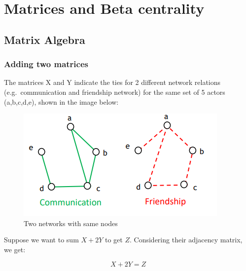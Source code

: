 \documentclass[
  notitlepage,
  onecolumn,
  openany]{book}
\begin{document}
\hypertarget{matrices-and-beta-centrality}{%
\chapter{Matrices and Beta centrality}\label{matrices-and-beta-centrality}}

\hypertarget{matrix-algebra}{%
\section{Matrix Algebra}\label{matrix-algebra}}

\hypertarget{adding-two-matrices}{%
\subsection{Adding two matrices}\label{adding-two-matrices}}

The matrices X and Y indicate the ties for 2 different network relations (e.g.~communication and friendship network) for the same set of 5 actors (a,b,c,d,e), shown in the image below:

\begin{figure}

{\centering \includegraphics[width=0.4\linewidth]{images/05-Matrices and Beta centrality/Untitled} 

}

\caption{Two networks with same nodes}\label{fig:unnamed-chunk-28}
\end{figure}

Suppose we want to sum \(X+2Y\) to get \(Z\). Considering their adjacency matrix, we get:

\[
X+2Y = Z
\]
\end{document}
